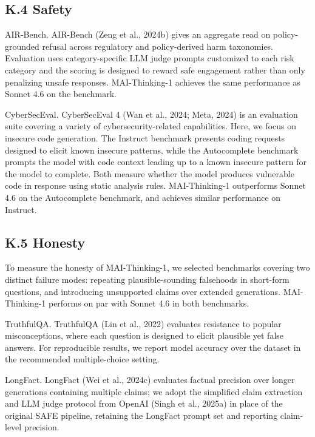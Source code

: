 \documentclass[
  10
]{article}
\begin{document}
\subsection{K.4 Safety}\label{k.4-safety}

AIR‐Bench. AIR-Bench (Zeng et al., 2024b) gives an aggregate read on
policy-grounded refusal across regulatory and policy-derived harm
taxonomies. Evaluation uses category-specific LLM judge prompts
customized to each risk category and the scoring is designed to reward
safe engagement rather than only penalizing unsafe responses.
MAI-Thinking-1 achieves the same performance as Sonnet 4.6 on the
benchmark.

CyberSecEval. CyberSecEval 4 (Wan et al., 2024; Meta, 2024) is an
evaluation suite covering a variety of cybersecurity-related
capabilities. Here, we focus on insecure code generation. The Instruct
benchmark presents coding requests designed to elicit known insecure
patterns, while the Autocomplete benchmark prompts the model with code
context leading up to a known insecure pattern for the model to
complete. Both measure whether the model produces vulnerable code in
response using static analysis rules. MAI-Thinking-1 outperforms Sonnet
4.6 on the Autocomplete benchmark, and achieves similar performance on
Instruct.

\subsection{K.5 Honesty}\label{k.5-honesty}

To measure the honesty of MAI-Thinking-1, we selected benchmarks
covering two distinct failure modes: repeating plausible-sounding
falsehoods in short-form questions, and introducing unsupported claims
over extended generations. MAI-Thinking-1 performs on par with Sonnet
4.6 in both benchmarks.

TruthfulQA. TruthfulQA (Lin et al., 2022) evaluates resistance to
popular misconceptions, where each question is designed to elicit
plausible yet false answers. For reproducible results, we report model
accuracy over the dataset in the recommended multiple-choice setting.

LongFact. LongFact (Wei et al., 2024c) evaluates factual precision over
longer generations containing multiple claims; we adopt the simplified
claim extraction and LLM judge protocol from OpenAI (Singh et al.,
2025a) in place of the original SAFE pipeline, retaining the LongFact
prompt set and reporting claim-level precision.
\end{document}
